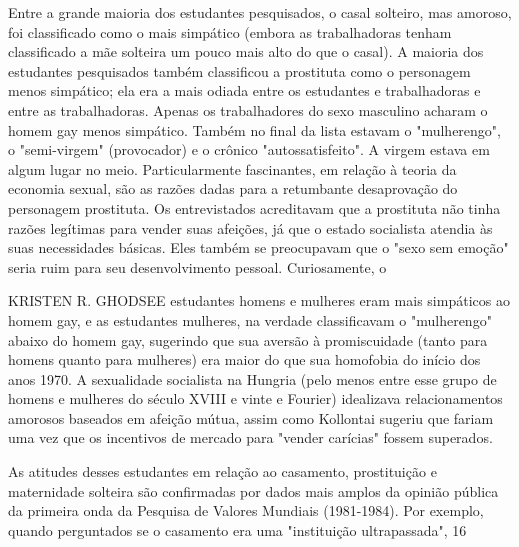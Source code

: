  \par 
Entre a grande maioria dos estudantes pesquisados, o casal solteiro, mas amoroso, foi classificado como o mais simpático (embora as trabalhadoras tenham classificado a mãe solteira um pouco mais alto do que o casal). A maioria dos estudantes pesquisados ​​também classificou a prostituta como o personagem menos simpático; ela era a mais odiada entre os estudantes e trabalhadoras e entre as trabalhadoras. Apenas os trabalhadores do sexo masculino acharam o homem gay menos simpático. Também no final da lista estavam o "mulherengo", o "semi-virgem" (provocador) e o crônico "autossatisfeito". A virgem estava em algum lugar no meio. Particularmente fascinantes, em relação à teoria da economia sexual, são as razões dadas para a retumbante desaprovação do personagem prostituta. Os entrevistados acreditavam que a prostituta não tinha razões legítimas para vender suas afeições, já que o estado socialista atendia às suas necessidades básicas. Eles também se preocupavam que o "sexo sem emoção" seria ruim para seu desenvolvimento pessoal. Curiosamente, o
 \par 
KRISTEN R. GHODSEE estudantes homens e mulheres eram mais simpáticos ao homem gay, e as estudantes mulheres, na verdade classificavam o "mulherengo" abaixo do homem gay, sugerindo que sua aversão à promiscuidade (tanto para homens quanto para mulheres) era maior do que sua homofobia do início dos anos 1970. A sexualidade socialista na Hungria (pelo menos entre esse grupo de homens e mulheres do século XVIII e vinte e Fourier) idealizava relacionamentos amorosos baseados em afeição mútua, assim como Kollontai sugeriu que fariam uma vez que os incentivos de mercado para "vender carícias" fossem superados.
 \par 
As atitudes desses estudantes em relação ao casamento, prostituição e maternidade solteira são confirmadas por dados mais amplos da opinião pública da primeira onda da Pesquisa de Valores Mundiais (1981-1984). Por exemplo, quando perguntados se o casamento era uma "instituição ultrapassada", 16%
